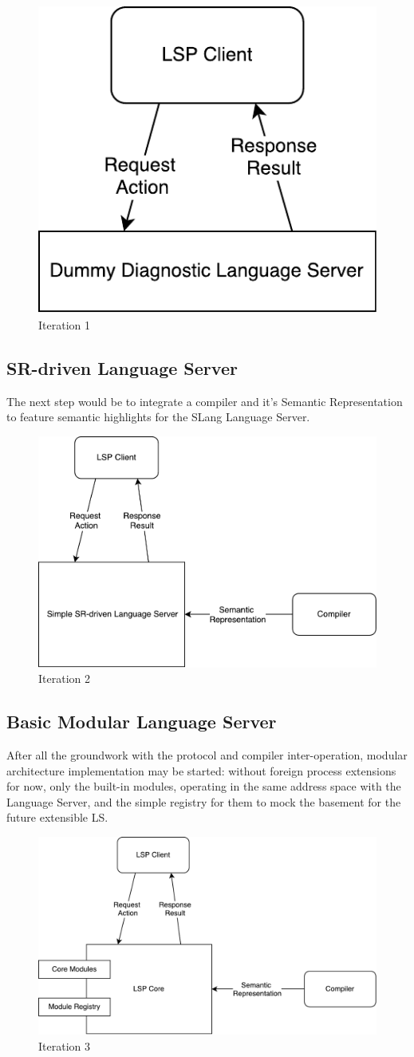 \begin{figure}[H]
    \centering
    \includegraphics[width=.3\textwidth]{figs/ls_iteration_1.pdf}
    \caption{Iteration 1}
\end{figure}

\newpage
\subsection{SR-driven Language Server}
The next step would be to integrate a compiler and it's Semantic Representation
to feature semantic highlights for the SLang Language Server.
\begin{figure}[H]
    \centering
    \includegraphics[width=.6\textwidth]{figs/ls_iteration_2.pdf}
    \caption{Iteration 2}
\end{figure}

\subsection{Basic Modular Language Server}
After all the groundwork with the protocol and compiler inter-operation, 
modular architecture implementation may be started: without foreign process extensions for now,
only the built-in modules, operating in the same address space with the Language Server,
and the simple registry for them to mock the basement for the future extensible LS.

\begin{figure}[H]
    \centering
    \includegraphics[width=.6\textwidth]{figs/ls_iteration_3.pdf}
    \caption{Iteration 3}
\end{figure}

